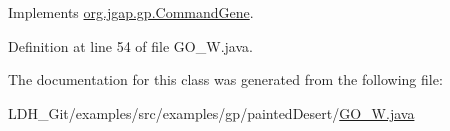 Implements \hyperlink{classorg_1_1jgap_1_1gp_1_1_command_gene_a236141d99059da808afe7a9217e411c7}{org.\-jgap.\-gp.\-Command\-Gene}.



Definition at line 54 of file G\-O\-\_\-\-W.\-java.



The documentation for this class was generated from the following file\-:\begin{DoxyCompactItemize}
\item 
L\-D\-H\-\_\-\-Git/examples/src/examples/gp/painted\-Desert/\hyperlink{_g_o___w_8java}{G\-O\-\_\-\-W.\-java}\end{DoxyCompactItemize}
